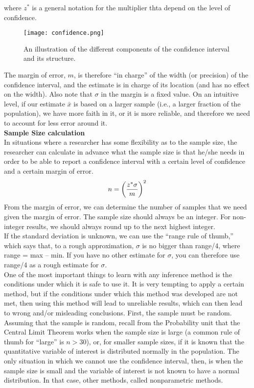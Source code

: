 \documentclass[10pt, a4paper]{article}
\begin{document}
where $z^*$ is a general notation for the multiplier thta depend on the level of confidence.
\begin{figure}
    [h!]
    \centering
    \texttt{[image: confidence.png]}
    \caption{An illustration of the different components of the confidence interval and its structure.}
\end{figure}
The margin of error, $m$, is therefore ``in charge'' of the width (or precision) of the confidence interval, and the estimate is in charge of its location (and has no effect on the width). Also note that $\sigma$ in the margin is a fixed value. 
On an intuitive level, if our estimate $\bar{x}$ is based on a larger sample (i.e., a larger fraction of the population), we have more faith in it, or it is more reliable, and therefore we need to account for less error around it.\\
\textbf{Sample Size calculation}\\
In situations where a researcher has some flexibility as to the sample size, the researcher can calculate in advance what the sample size is that he/she needs in order to be able to report a confidence interval with a certain level of confidence and a certain margin of error.
\begin{equation}
n = \left({z^*\sigma \over m }\right)^2
\end{equation}
From the margin of error, we can determine the number of samples that we need given the margin of error. The sample size should always be an integer. For non-integer results, we should always round up to the next highest integer.\\
If the standard deviation is unknown, we can use the ``range rule of thumb,'' which says that, to a rough approximation, $\sigma$ is no bigger than range/4, where range = max – min. If you have no other estimate for $\sigma$, you can therefore use range/4 as a rough estimate for $\sigma$.\\
One of the most important things to learn with any inference method is the conditions under which it is safe to use it. It is very tempting to apply a certain method, but if the conditions under which this method was developed are not met, then using this method will lead to unreliable results, which can then lead to wrong and/or misleading conclusions. 
First, the sample must be random. Assuming that the sample is random, recall from the Probability unit that the Central Limit Theorem works when the sample size is large (a common rule of thumb for ``large'' is $n > 30$), or, for smaller sample sizes, if it is known that the quantitative variable of interest is distributed normally in the population. The only situation in which we cannot use the confidence interval, then, is when the sample size is small and the variable of interest is not known to have a normal distribution. In that case, other methods, called nonparametric methods.\\
\end{document}
